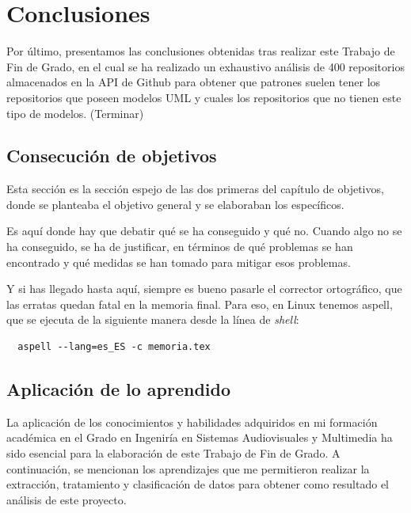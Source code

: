 \documentclass[a4paper, 12pt]{book}
\begin{document}

\cleardoublepage
\chapter{Conclusiones}
\label{chap:conclusiones}

Por último, presentamos las conclusiones obtenidas tras realizar este Trabajo de Fin de Grado, en el cual se ha realizado un exhaustivo análisis de 400 repositorios almacenados en la API de Github para obtener que patrones suelen tener los repositorios que poseen modelos UML y cuales los repositorios que no tienen este tipo de modelos. 
(Terminar)

\section{Consecución de objetivos}
\label{sec:consecucion-objetivos}

Esta sección es la sección espejo de las dos primeras del capítulo de objetivos, donde se planteaba el objetivo general y se elaboraban los específicos.

Es aquí donde hay que debatir qué se ha conseguido y qué no. 
Cuando algo no se ha conseguido, se ha de justificar, en términos de qué problemas se han encontrado y qué medidas se han tomado para mitigar esos problemas.

Y si has llegado hasta aquí, siempre es bueno pasarle el corrector ortográfico, que las erratas quedan fatal en la memoria final.
Para eso, en Linux tenemos aspell, que se ejecuta de la siguiente manera desde la línea de \emph{shell}:


\begin{verbatim}
  aspell --lang=es_ES -c memoria.tex
\end{verbatim}

\section{Aplicación de lo aprendido}
\label{sec:aplicacion}

La aplicación de los conocimientos y habilidades adquiridos en mi formación académica en el Grado en Ingeniría en Sistemas Audiovisuales y Multimedia ha sido esencial para la elaboración de este Trabajo de Fin de Grado.
A continuación, se mencionan los aprendizajes que me permitieron realizar la extracción, tratamiento y clasificación de datos para obtener como resultado el análisis de este proyecto. 
\end{document}
